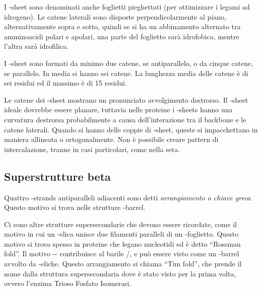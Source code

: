 \begingroup {} \endgroup

I \beta-sheet sono denominati anche foglietti pieghettati (per
ottimizzare i legami ad idrogeno). Le catene laterali sono disposte
perpendicolarmente al piano, alternativamente sopra e sotto, quindi se
si ha un abbinamento alternato tra amminoacidi polari e apolari, una
parte del foglietto sarà idrofobica, mentre l'altra sarà idrofilica.

I \beta-sheet sono formati da minimo due catene, se antiparallelo, o da
cinque catene, se parallelo. In media si hanno sei catene. La lunghezza
media delle catene è di sei residui ed il massimo è di 15 residui.

Le catene dei \beta-sheet mostrano un pronunciato avvolgimento
destrorso. Il \beta-sheet ideale dovrebbe essere planare, tuttavia nelle
proteine i \beta-sheets hanno una curvatura destrorsa probabilmente a
causa dell'interazione tra il backbone e le catene laterali. Quando si
hanno delle coppie di \beta-sheet, queste si impacchettano in maniera
allineata o ortogonalmente.
Non è possibile creare pattern di intercalazione, tranne in casi
particolari, come nella seta.




\subsection{Superstrutture beta}

Quattro \beta-strands antiparalleli adiacenti sono detti \emph{arrangiamento
a chiave greca}. Questo motivo si trova nelle strutture \beta-barrel.



Ci sono altre strutture supersecondarie che devono essere ricordate,
come il motivo \beta\alpha\beta{} in cui un \alpha-elica unisce due
filamenti paralleli di un \beta-foglietto. Questo motivo si trova spesso
in proteine che legano nucleotidi ed è detto ``Rossman fold''. Il motivo
\beta-\alpha-\beta{} contribuisce al barile \alpha/\beta, e può essere
visto come un \beta-barrel avvolto da \alpha-eliche. Questo
arrangiamento si chiama ``Tim fold'', che prende il nome dalla struttura
supersecondaria dove è stato visto per la prima volta, ovvero l'enzima
Trioso Fosfato Isomerasi.

